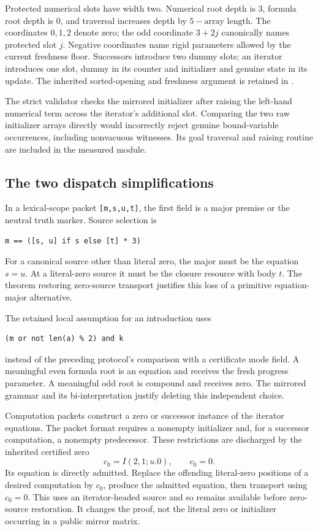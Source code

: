 Protected numerical slots have width two.  Numerical root depth is
3, formula root depth is 0, and traversal increases depth by
$5-\text{array length}$.  The coordinates $0,1,2$ denote zero;
the odd coordinate $3+2j$ canonically names protected slot $j$.
Negative coordinates name rigid parameters allowed by the current
freshness floor.  Successors introduce two dummy slots; an iterator
introduces one slot, dummy in its counter and initializer and genuine
state in its update.  The inherited sorted-opening and freshness
argument is retained in .

The strict validator checks the mirrored initializer after raising
the left-hand numerical term across the iterator's additional slot.
Comparing the two raw initializer arrays directly would incorrectly
reject genuine bound-variable occurrences, including nonvacuous
witnesses.  Its goal traversal and raising routine are included in
the measured module.

\subsection{The two dispatch simplifications}

In a lexical-scope packet \texttt{[m,s,u,t]}, the first field is a
major premise or the neutral truth marker.  Source selection is
\begin{lstlisting}
m == ([s, u] if s else [t] * 3)
\end{lstlisting}
For a canonical source other than literal zero, the major must be the
equation $s=u$.  At a literal-zero source it must be the closure
resource with body $t$.  The theorem restoring zero-source transport
justifies this loss of a primitive equation-major alternative.

The retained local assumption for an introduction uses
\begin{lstlisting}
(m or not len(a) % 2) and k
\end{lstlisting}
instead of the preceding protocol's comparison with a certificate
mode field.  A meaningful even formula root is an equation and
receives the fresh progress parameter.  A meaningful odd root is
compound and receives zero.  The mirrored grammar and its
bi-interpretation justify deleting this independent choice.

Computation packets construct a zero or successor instance of the
iterator equations.  The packet format requires a nonempty
initializer and, for a successor computation, a nonempty predecessor.
These restrictions are discharged by the inherited certified zero
\[
                       c_0=I(2,1;u.0),\qquad c_0=0.
\]
Its equation is directly admitted.  Replace the offending literal-zero
positions of a desired computation by $c_0$, produce the admitted
equation, then transport using $c_0=0$.  This uses an iterator-headed
source and so remains available before zero-source restoration.
It changes the proof, not the literal zero or initializer occurring
in a public mirror matrix.

